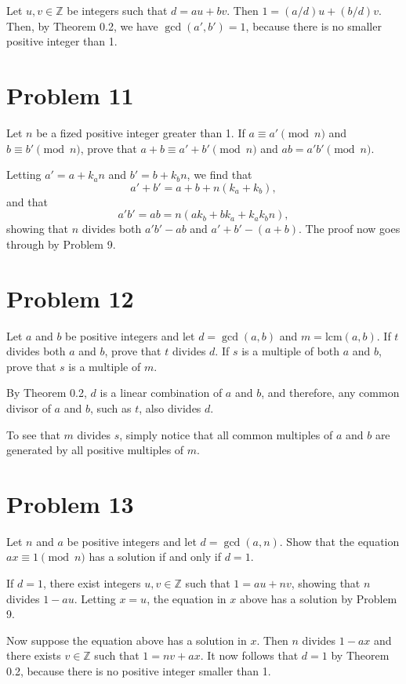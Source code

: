 \documentclass[12pt]{article}
\newcommand{\lcm}{\mbox{lcm}}
\newcommand{\Z}{\mathbb{Z}}
\begin{document}
Let $u,v\in\Z$ be integers such that $d=au+bv$.  Then $1=(a/d)u+(b/d)v$.
Then, by Theorem 0.2, we have $\gcd(a',b')=1$, because there is no smaller
positive integer than 1.

\section*{Problem 11}

Let $n$ be a fized positive integer greater than 1.  If $a\equiv a'\pmod n$ and
$b\equiv b'\pmod n$, prove that $a+b\equiv a'+b'\pmod n$ and $ab=a'b'\pmod n$.

Letting $a'=a+k_an$ and $b'=b+k_bn$, we find that
\begin{equation*}
a' + b' = a + b + n(k_a+k_b),
\end{equation*}
and that
\begin{equation*}
a'b' = ab = n(ak_b + bk_a + k_ak_bn),
\end{equation*}
showing that $n$ divides both $a'b'-ab$ and $a'+b'-(a+b)$.
The proof now goes through by Problem 9.

\section*{Problem 12}

Let $a$ and $b$ be positive integers and let $d=\gcd(a,b)$ and $m=\lcm(a,b)$.
If $t$ divides both $a$ and $b$, prove that $t$ divides $d$.  If $s$ is a multiple of
both $a$ and $b$, prove that $s$ is a multiple of $m$.

By Theorem 0.2, $d$ is a linear combination of $a$ and $b$, and therefore,
any common divisor of $a$ and $b$, such as $t$, also divides $d$.

To see that $m$ divides $s$, simply notice that all common multiples
of $a$ and $b$ are generated by all positive multiples of $m$.

\section*{Problem 13}

Let $n$ and $a$ be positive integers and let $d=\gcd(a,n)$.  Show that the
equation $ax\equiv 1\pmod n$ has a solution if and only if $d=1$.

If $d=1$, there exist integers $u,v\in\Z$ such that $1=au+nv$, showing
that $n$ divides $1-au$.  Letting $x=u$, the equation in $x$ above has
a solution by Problem 9.

Now suppose the equation above has a solution in $x$.  Then $n$ divides $1-ax$
and there exists $v\in\Z$ such that $1=nv+ax$.  It now follows that $d=1$
by Theorem 0.2, because there is no positive integer smaller than 1.
\end{document}
